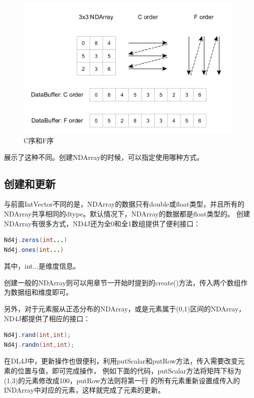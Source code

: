 \begin{figure}[!htb]
\centerline{\includegraphics[width=.35\figwidth]{images/c_vs_f_order.png}}
\caption{C序和F序}
\label{fig:part3_c_vs_f_order}
\end{figure}

\noindent
{}展示了这种不同。创建NDArray的时候，可以指定使用哪种方式。

\subsection{创建和更新}
与前面IntVector不同的是，NDArray的数据只有double或float类型，并且所有的NDArray共享相同的dtype。默认情况下，NDArray的数据都是float类型的。
创建NDArray有很多方式，ND4J还为全0和全1数组提供了便利接口：
\vspace{0.3cm}

\begin{lstlisting}[language=Java]
Nd4j.zeros(int...)
Nd4j.ones(int...)
\end{lstlisting}
\noindent
其中，int...是维度信息。

创建一般的NDArray则可以用章节一开始时提到的create()方法，传入两个数组作为数据组和维度即可。

另外，对于元素服从正态分布的NDArray，或是元素属于(0,1)区间的NDArray，ND4J都提供了相应的接口：
\begin{lstlisting}[language=Java]
Nd4j.rand(int,int);
Nd4j.randn(int,int);
\end{lstlisting}

在DL4J中，更新操作也很便利，利用putScalar和putRow方法，传入需要改变元素的位置与值，即可完成操作，
例如下面的代码，putScalar方法将矩阵下标为(1,3)的元素修改成100，putRow方法则将第一行
的所有元素重新设置成传入的INDArray中对应的元素，这样就完成了元素的更新。

